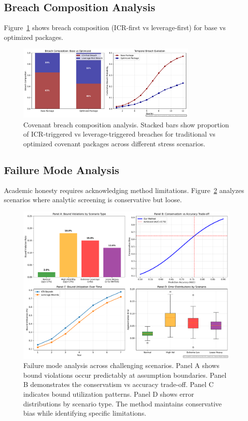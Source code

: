 \documentclass[11pt,a4paper]{article}
\begin{document}
\subsection{Breach Composition Analysis}

Figure~\ref{fig:breach_composition} shows breach composition (ICR-first vs leverage-first) for base vs optimized packages.

\begin{figure}[h]
\centering
\includegraphics[width=0.8\textwidth]{../analysis/figures/F16_breach_composition.pdf}
\caption{Covenant breach composition analysis. Stacked bars show proportion of ICR-triggered vs leverage-triggered breaches for traditional vs optimized covenant packages across different stress scenarios.}
\label{fig:breach_composition}
\end{figure}

\subsection{Failure Mode Analysis}

Academic honesty requires acknowledging method limitations. Figure~\ref{fig:failure_modes} analyzes scenarios where analytic screening is conservative but loose.

\begin{figure}[h]
\centering
\includegraphics[width=\textwidth]{../analysis/figures/F15_failure_modes.pdf}
\caption{Failure mode analysis across challenging scenarios. Panel A shows bound violations occur predictably at assumption boundaries. Panel B demonstrates the conservatism vs accuracy trade-off. Panel C indicates bound utilization patterns. Panel D shows error distributions by scenario type. The method maintains conservative bias while identifying specific limitations.}
\label{fig:failure_modes}
\end{figure}
\end{document}

